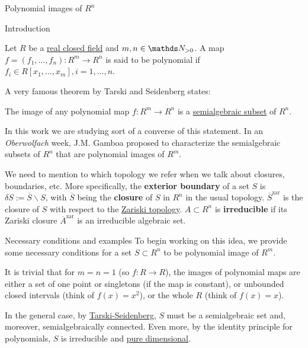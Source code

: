 \documentclass[11pt, a4paper, english, twoside, notitlepage]{report}
\begin{document}
\begin{chapter}{Polynomial images of $R^n$}

\begin{section}{Introduction}
	\begin{definition}\label{polyMap}
	Let $R$ be a \hyperref[realCField]{real closed field} and $m, n \in \N_{>0}$. A map $f = (f_1, \dots, f_n): R^m \longrightarrow R^n$ is said to be polynomial if $f_i \in R[x_1, \dots, x_m], i = 1,\dots, n$. 
	\end{definition}
	
	A very famous theorem by Tarski and Seidenberg states:
	\begin{theorem}\label{tarskiSeidenberg}
	The image of any polynomial map $f: R^m \longrightarrow R^n$ is a \hyperref[semialgSet]{semialgebraic subset} of $R^n$.
	\end{theorem}
	
	In this work we are studying sort of a converse of this statement. In an \emph{Oberwolfach} week, J.M. Gamboa proposed to characterize the semialgebraic subsets of $R^n$ that are polynomial images of $R^m$.
	
	
	\begin{notation}
	We need to mention to which topology we refer when we talk about closures, boundaries, etc. More specifically, the \textbf{exterior boundary} of a set $S$ is $\delta S := \overline{S} \backslash S$, with $\overline{S}$ being the \textbf{closure} of $S$ in $R^n$ in the usual topology. $\overline{S}^{\text{zar}}$ is the closure of $S$ with respect to the \hyperref[zariski]{Zariski topology}. $A\subset R^n$ is \textbf{irreducible} if its Zariski closure $\overline{A}^{\text{zar}}$ is an irreducible algebraic set.
	\end{notation}
	
	\begin{subsection}{Necessary conditions and examples}
	To begin working on this idea, we provide some necessary conditions for a set $S\subset R^n$ to be polynomial image of $R^m$. 
	
	It is trivial that for $m = n = 1$ (so $f: R \rightarrow R$), the images of polynomial maps are either a set of one point or singletons (if the map is constant), or unbounded closed intervals (think of $f(x) = x^2$), or the whole $R$ (think of $f(x) = x$).
	
	In the general case, by \hyperref[tarskiSeidenberg]{Tarski-Seidenberg}, $S$ must be a semialgebraic set and, moreover, semialgebraically connected. Even more, by the identity principle for polynomials, $S$ is irreducible and \hyperref[pureDim]{pure dimensional}.
	

\end{subsection}
\end{section}
\end{chapter}
\end{document}
